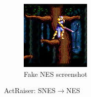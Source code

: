 \documentclass[10pt,twocolumn,letterpaper]{article}
\begin{document}
\begin{figure}[H]
\begin{subfigure}[b]{0.225\textwidth}
      \includegraphics[width=\textwidth]{figures/snes_to_nes/AV_Mahjong_Club_(J)_(Unl)_copy__ucc__8_fake_A.png}
      \caption{Fake NES screenshot}
      \label{fig:ss1b}
   \end{subfigure}
   \caption{ActRaiser: SNES$\rightarrow$NES}
\end{figure}
\end{document}
